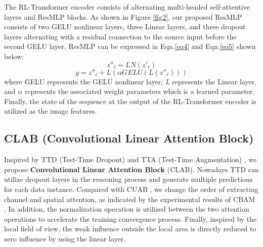 \documentclass[runningheads]{llncs}
\begin{document}
The RL-Transformer encoder consists of alternating multi-headed self-attentive layers and ResMLP blocks. As shown in Figure \ref{fig2}, our proposed ResMLP consists of two GELU \cite{hendrycks2016gaussian} nonlinear layers, three Linear layers, and three dropout layers alternating with a residual connection to the source input before the second GELU \cite{hendrycks2016gaussian} layer. ResMLP can be expressed in Eqn.\ref{eq4} and Eqn.\ref{eq5} shown below:
\begin{equation}
{z''_\ell } = LN({z'_\ell })
\label{eq4}
\end{equation}
\begin{equation}
y = {z''_\ell } + L(\alpha GELU(L({z''_\ell })))
\label{eq5}
\end{equation}
where GELU represents the GELU\cite{hendrycks2016gaussian} nonlinear layer, \emph{L} represents the Linear layer, and $\alpha$ represents the associated weight parameters which is a learned parameter. Finally, the state of the sequence at the output of the RL-Transformer encoder is utilized as the image features.

\subsection{CLAB (Convolutional Linear Attention Block)}
\label{sec3.3}
Inspired by TTD (Test-Time Dropout) \cite{2018Aleatoric} and TTA (Test-Time Augmentation) \cite{2014Evaluation}, we propose \textbf{Convolutional Linear Attention Block} (CLAB). Nowadays TTD \cite{2018Aleatoric} can utilize dropout layers in the reasoning process and generate multiple predictions for each data instance. Compared with CUAB \cite{wang2021cuab}, we change the order of extracting channel and spatial attention, as indicated by the experimental results of CBAM \cite{woo2018cbam}. In addition, the normalization operation is utilized between the two attention operations to accelerate the training convergence process. Finally, inspired by the local field of view, the weak influence outside the local area is directly reduced to zero influence by using the linear layer.
\end{document}
